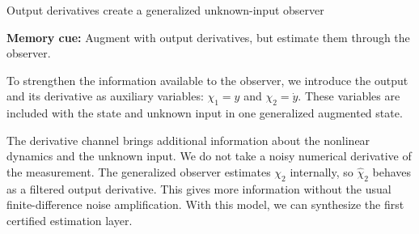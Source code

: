 \documentclass[aspectratio=169,10pt]{beamer}
\begin{document}
\begin{frame}{Output derivatives create a generalized unknown-input observer}
{  \textbf{Memory cue:} Augment with output derivatives, but estimate them through the observer.\par\smallskip
  To strengthen the information available to the observer, we introduce the output and its derivative as auxiliary variables: $\chi_1=y$ and $\chi_2=\dot y$. These variables are included with the state and unknown input in one generalized augmented state.\par\smallskip
  The derivative channel brings additional information about the nonlinear dynamics and the unknown input. We do not take a noisy numerical derivative of the measurement. The generalized observer estimates $\chi_2$ internally, so $\hat\chi_2$ behaves as a filtered output derivative. This gives more information without the usual finite-difference noise amplification. With this model, we can synthesize the first certified estimation layer.
}
\end{frame}
\end{document}
